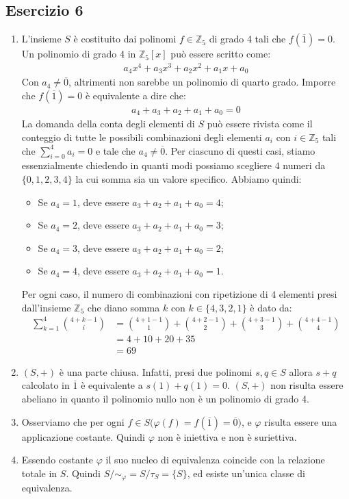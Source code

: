 \subsection*{Esercizio 6}
\begin{enumerate}[label=(\textit{\roman*})]
	\item L'insieme $S$ è costituito dai polinomi $f \in \mathbb{Z}_{5}$ di grado 4 tali che $f(\overline{1})=0$. Un polinomio di grado 4 in $\mathbb{Z}_{5}[x]$ può essere scritto come:
	\begin{align*}
		a_{4}x^{4}+a_{3}x^{3}+a_{2}x^{2}+a_{1}x+a_{0}
	\end{align*}
	Con $a_{4} \neq \overline{0}$, altrimenti non sarebbe un polinomio di quarto grado. Imporre che $f(\overline{1})=0$ è equivalente a dire che:
	\begin{align*}
		a_{4}+a_{3}+a_{2}+a_{1}+a_{0} = 0
	\end{align*}
	La domanda della conta degli elementi di $S$ può essere rivista come il conteggio di tutte le possibili combinazioni degli elementi $a_{i}$ con $i \in \mathbb{Z}_{5}$ tali che $\sum_{i=0}^{4} a_{i}=0$ e tale che $a_{4} \neq \overline{0}$.
	Per ciascuno di questi casi, stiamo essenzialmente chiedendo in quanti modi possiamo scegliere $4$ numeri da $\{0, 1, 2, 3, 4\}$ la cui somma sia un valore specifico. Abbiamo quindi:
	\begin{itemize}
		\item Se $a_{4}=1$, deve essere $a_{3}+a_{2}+a_{1}+a_{0}=4$;
		\item Se $a_{4}=2$, deve essere $a_{3}+a_{2}+a_{1}+a_{0}=3$;
		\item Se $a_{4}=3$, deve essere $a_{3}+a_{2}+a_{1}+a_{0}=2$;
		\item Se $a_{4}=4$, deve essere $a_{3}+a_{2}+a_{1}+a_{0}=1$.
	\end{itemize}
	Per ogni caso, il numero di combinazioni con ripetizione di $4$ elementi presi dall'insieme $\mathbb{Z}_{5}$ che diano somma $k$ con $k \in \{4,3,2,1\}$ è dato da:
	\begin{align*}
		\sum_{k=1}^{4} \binom{4+k-1}{i} &= \binom{4+1-1}{1}+\binom{4+2-1}{2}+\binom{4+3-1}{3}+\binom{4+4-1}{4} \\
		&= 4 + 10 + 20 + 35 \\
		&= 69
	\end{align*}
	\item $(S,+)$ è una parte chiusa. Infatti, presi due polinomi $s,q \in S$ allora $s+q$ calcolato in $\overline{1}$ è equivalente a $s(1)+q(1)=0$. $(S,+)$ non risulta essere abeliano in quanto il polinomio nullo non è un polinomio di grado 4.
	\item Osserviamo che per ogni $f \in S\bigl(\varphi(f)= f(\overline{1})=\overline{0}\bigr)$, e $\varphi$ risulta essere una applicazione costante. Quindi $\varphi$ non è iniettiva e non è suriettiva. 
	\item Essendo costante $\varphi$ il suo nucleo di equivalenza coincide con la relazione totale in $S$. Quindi $S/{\sim_{\varphi}} = S/{\tau_{S}} = \{S\}$, ed esiste un'unica classe di equivalenza.
\end{enumerate}
